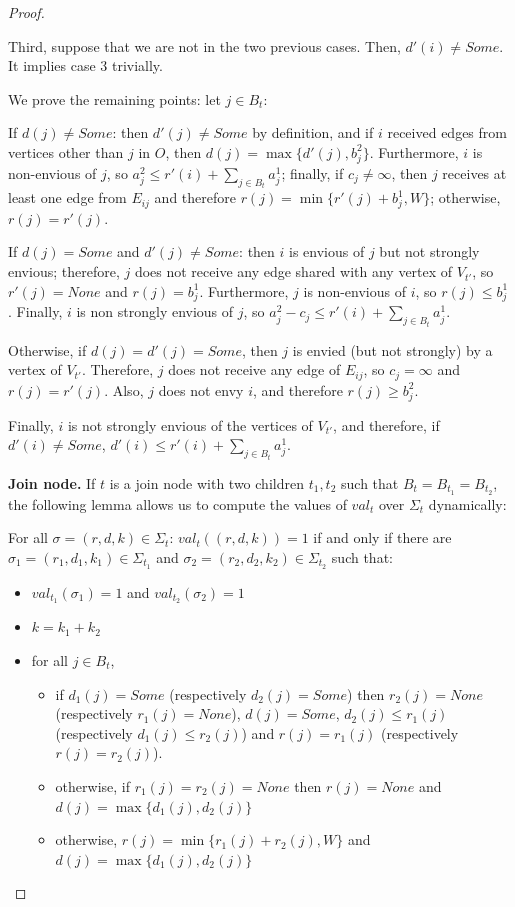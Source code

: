 \begin{proof}
\begin{nestedproof}
        Third, suppose that we are not in the two previous cases. Then, $d'(i)\neq Some$. It implies case 3 trivially.

        We prove the remaining points: let $j\in B_t$:

        If $d(j)\neq Some$: then $d'(j)\neq Some$ by definition, and if $i$ received edges from vertices other than $j$ in $O$, then $d(j)=\max\{d'(j),b_j^2\}$. Furthermore, $i$ is non-envious of $j$, so $a_j^2\leq r'(i)+\sum_{j\in B_t}a_{j}^1$; finally, if $c_j\neq\infty$, then $j$ receives at least one edge from $E_{ij}$ and therefore $r(j)=\min\{r'(j)+b_j^1,W\}$; otherwise, $r(j)=r'(j)$.

        If $d(j)=Some$ and $d'(j)\neq Some$: then $i$ is envious of $j$ but not strongly envious; therefore, $j$ does not receive any edge shared with any vertex of $V_{t'}$, so $r'(j)=None$ and $r(j)=b_j^1$. Furthermore, $j$ is non-envious of $i$, so $r(j)\leq b_j^1$. Finally, $i$ is non strongly envious of $j$, so $a_j^2-c_j\leq r'(i)+\sum_{j\in B_t}a_{j}^1$.

        Otherwise, if $d(j)=d'(j)=Some$, then $j$ is envied (but not strongly) by a vertex of $V_{t'}$. Therefore, $j$ does not receive any edge of $E_{ij}$, so $c_j=\infty$ and $r(j)=r'(j)$. Also, $j$ does not envy $i$, and therefore $r(j)\geq b_j^2$.

        Finally, $i$ is not strongly envious of the vertices of $V_{t'}$, and therefore, if $d'(i)\neq Some$, $d'(i)\leq r'(i)+\sum_{j\in B_t}a_{j}^1$.

    \end{nestedproof}

    \textbf{Join node.} If $t$ is a join node with two children $t_1,t_2$ such that $B_t=B_{t_1}=B_{t_2}$, the following lemma allows us to compute the values of $val_t$ over $\Sigma_t$ dynamically:

    \begin{lemma}
        For all $\sigma=(r,d,k)\in \Sigma_t$: $val_t((r,d,k))=1$ if and only if there are $\sigma_1=(r_1,d_1,k_1)\in \Sigma_{t_1}$ and $\sigma_2=(r_2,d_2,k_2)\in \Sigma_{t_2}$ such that:

        \begin{itemize}
            \item $val_{t_1}(\sigma_1)=1$ and $val_{t_2}(\sigma_2)=1$
            \item $k=k_1+k_2$
            \item for all $j\in B_t$,
            \begin{itemize}
                \item if $d_1(j)=Some$ (respectively $d_2(j)=Some$) then $r_2(j)=None$ (respectively $r_1(j)=None$), $d(j)=Some$, $d_2(j)\leq r_1(j)$ (respectively $d_1(j)\leq r_2(j)$) and $r(j)=r_1(j)$ (respectively $r(j)=r_2(j)$).
                \item otherwise, if $r_1(j)=r_2(j)=None$ then $r(j)=None$ and $d(j)=\max\{d_1(j),d_2(j)\}$
                \item otherwise, $r(j)=\min\{r_1(j)+r_2(j),W\}$ and $d(j)=\max\{d_1(j),d_2(j)\}$
            \end{itemize}
        \end{itemize}


\end{lemma}
\end{proof}
